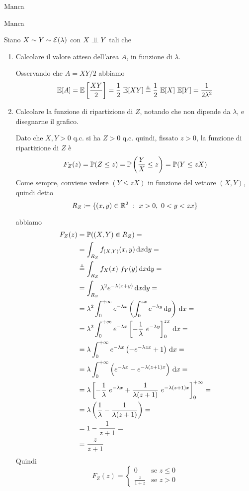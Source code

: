 \Soluzione{}
Manca

\Soluzione{}
Manca

\Soluzione{}
Siano $X\sim Y\sim\mathcal{E}(\lambda)$ con $X\perp \!\!\! \perp Y$ tali che


\begin{enumerate}
\item Calcolare il valore atteso dell'area $A$, in funzione di $\lambda$.

Osservando che $A=XY/2$ abbiamo
\[
\EE[A]=\EE\left[ \frac{XY}{2} \right]=\frac{1}{2}\ \EE[XY]\overset{\underset{\indep}{}}{=}\frac{1}{2}\ \EE[X]\ \EE[Y]=\frac{1}{2\lambda^2}
\]

\item Calcolare la funzione di ripartizione di $Z$, notando che non dipende da $\lambda$, e disegnarne il grafico.

Dato che $X,Y>0$ q.c. si ha $Z>0$ q.c. quindi, fissato $z>0$, la funzione di ripartizione di $Z$ è
\[
F_Z(z)=\mathbb{P}(Z\leq z)=\mathbb{P}\left(\frac{Y}{X}\leq z \right)=\mathbb{P}(Y\leq zX)
\] 
Come sempre, conviene vedere $(Y\leq zX)$ in funzione del vettore $(X,Y)$, quindi detto
\[
R_Z\coloneqq\{(x,y)\in\RR^2\ :\ x>0,\ 0<y<zx\}
\]


abbiamo 
\begin{gather*}
\begin{aligned}
F_Z(z)&=\mathbb{P}((X,Y)\in R_Z)= \\
&=\int_{R_Z}f_{(X,Y)}(x,y)\, \mathrm{d} x \mathrm{d} y= \\
&\overset{\underset{\perp \!\!\! \perp}{}}{=}\int_{R_Z}f_X(x)\ f_Y(y)\, \mathrm{d} x \mathrm{d} y=\\
&=\int_{R_Z}\lambda^2e^{-\lambda(x+y)}\, \mathrm{d} x \mathrm{d} y=\\
&=\lambda^2\int_{0}^{+\infty} e^{-\lambda x} \left(\int_0^{zx}e^{-\lambda y}\, \mathrm{d} y  \right)\, \mathrm{d} x=\\
&=\lambda^2\int_{0}^{+\infty} e^{-\lambda x} \left[-\frac{1}{\lambda}\ e^{-\lambda y}  \right]_0^{zx}\, \mathrm{d} x=\\
&=\lambda\int_{0}^{+\infty} e^{-\lambda x} \left(-e^{-\lambda zx}+1  \right)\, \mathrm{d} x=\\
&=\lambda\int_{0}^{+\infty} \left(e^{-\lambda x} -e^{-\lambda (z+1)x}  \right)\, \mathrm{d} x=\\
&=\lambda\left[-\frac{1}{\lambda}\ e^{-\lambda x}+\frac{1}{\lambda(z+1)}\ e^{-\lambda (z+1)x}  \right]_0^{+\infty}=\\
&=\lambda\left(\frac{1}{\lambda}-\frac{1}{\lambda(z+1)} \right)=\\
&=1-\frac{1}{z+1}=\\
&=\frac{z}{z+1}
\end{aligned}
\end{gather*}
Quindi
\[
F_Z(z)=
\begin{cases}
0 &\text{se }z\leq 0 \\
\displaystyle\frac{z}{1+z} &\text{se }z>0
\end{cases}
\]


\end{enumerate}

